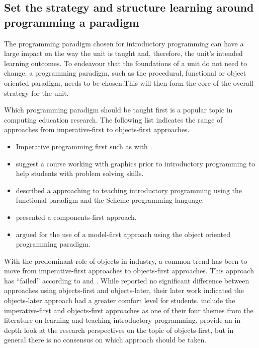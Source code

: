 \subsection{Set the strategy and structure learning around programming a paradigm} %
\label{ssub:set_the_strategy_and_structure_learning_around_programming_a_paradigm}

The programming paradigm chosen for introductory programming can have a large impact on the way the unit is taught and, therefore, the unit's intended learning outcomes. To endeavour that the foundations of a unit do not need to change, a programming paradigm, such as the procedural, functional or object oriented paradigm, needs to be chosen.This will then form the core of the overall strategy for the unit.

Which programming paradigm should be taught first is a popular topic in computing education research. The following list indicates the range of approaches from imperative-first to objects-first approaches.
\begin{itemize}[noitemsep,nolistsep]
	\item Imperative programming first such as with \citet{Koffman:1988a}.
	\item \citet{Cooper:2003} suggest a course working with graphics prior to introductory programming to help students with problem solving skills.
	\item \citet{Felleisen:2004} described a approaching to teaching introductory programming using the functional paradigm and the Scheme programming language.
	\item \citet{Howe:2004} presented a components-first approach.
	\item \citet{Bennedsen:2004} argued for the use of a model-first approach using the object oriented programming paradigm.
\end{itemize}

 With the predominant role of objects in industry, a common trend has been to move from imperative-first approaches to objects-first approaches. This approach has ``failed'' according to \citet{Astrachan:2005} and \citet{Reges:2006}. While \citet{Ehlert:2009} reported no significant difference between approaches using objects-first and objects-later, their later work \cite{Ehlert:2010} indicated the objects-later approach had a greater comfort level for students. \citet{Robins:2003} include the imperative-first and objects-first approaches as one of their four themes from the literature on learning and teaching introductory programming. \citet{Lister:2006a} provide an in depth look at the research perspectives on the topic of objects-first, but in general there is no consensus on which approach should be taken.


